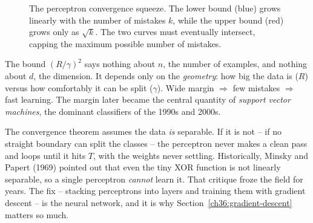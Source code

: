 \begin{figure}[htbp]
\centering
{}
\caption{The perceptron convergence squeeze. The lower bound (blue) grows linearly with the number of mistakes $k$, while the upper bound (red) grows only as $\sqrt{k}$. The two curves must eventually intersect, capping the maximum possible number of mistakes.}
\label{ch36:fig-perceptron-squeeze}
\end{figure}

\begin{focusbox}
The bound $(R/\gamma)^2$ says nothing about $n$, the number of
examples, and nothing about $d$, the dimension. It depends only on the
\emph{geometry}: how big the data is ($R$) versus how comfortably it can be
split ($\gamma$). Wide margin $\Rightarrow$ few mistakes $\Rightarrow$ fast
learning. The margin later became the central quantity of
\emph{support vector machines}, the dominant classifiers of the 1990s and 2000s.
\end{focusbox}

\begin{trapbox}
The convergence theorem assumes the data \emph{is} separable. If it is not -- if
no straight boundary can split the classes -- the perceptron never makes a clean
pass and loops until it hits $T$, with the weights never settling. Historically,
Minsky and Papert (1969) pointed out that even the tiny XOR
function is not linearly separable, so a single perceptron \emph{cannot} learn
it. That critique froze the field for years. The fix -- stacking perceptrons
into layers and training them with gradient descent -- is the neural network,
and it is why Section~\ref{ch36:gradient-descent} matters so much.
\end{trapbox}

